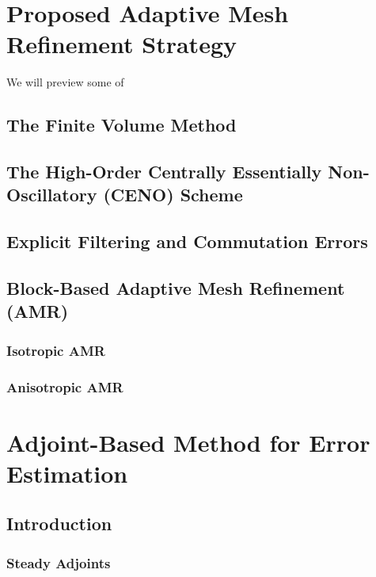 \documentclass[titlepage,11pt,letterpaper]{article}
\begin{document}
\section{Proposed Adaptive Mesh Refinement Strategy}

\noindent We will preview some of\\
\subsection{The Finite Volume Method}
\subsection{The High-Order Centrally Essentially Non-Oscillatory (CENO) Scheme}
\subsection{Explicit Filtering and Commutation Errors}
\subsection{Block-Based Adaptive Mesh Refinement (AMR)}
\subsubsection{Isotropic AMR}
\subsubsection{Anisotropic AMR}

\newpage
\section{Adjoint-Based Method for Error Estimation}
\subsection{Introduction}
\subsubsection{Steady Adjoints}
\end{document}
